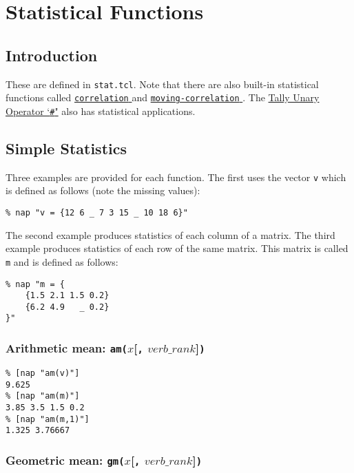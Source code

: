     \section{Statistical Functions}

  \subsection{
    \label{Introduction}Introduction
  }
These are defined in 
  \texttt{stat.tcl}. Note that there are also built-in statistical
  functions called 
  \href{function.html\#Correlation}{ \texttt{correlation} } and 
  \href{function.html\#Correlation}{ \texttt{moving-correlation} }. The 
  \href{op.html\#Tally}{Tally Unary Operator `\texttt{\#}"} also has statistical applications.
  \subsection{
    \label{Simple-Statistics}Simple Statistics
  }

  

Three examples are provided for each function. The first uses the
  vector 
  \texttt{v} which is defined as follows (note the missing
  values):
  \begin{verbatim}
% nap "v = {12 6 _ 7 3 15 _ 10 18 6}"
\end{verbatim}

  

The second example produces statistics of each column of a matrix.
  The third example produces statistics of each row of the same matrix.
  This matrix is called 
  \texttt{m} and is defined as follows:
  \begin{verbatim}
% nap "m = {
    {1.5 2.1 1.5 0.2}
    {6.2 4.9   _ 0.2}
}"
\end{verbatim}

  \subsubsection{
    \label{am}Arithmetic mean: \texttt{am(}$x$[\texttt{,} $verb\_rank$]\texttt{)}
  }

  \begin{verbatim}
% [nap "am(v)"]
9.625
% [nap "am(m)"]
3.85 3.5 1.5 0.2
% [nap "am(m,1)"]
1.325 3.76667
\end{verbatim}

  \subsubsection{
    \label{gm}Geometric mean: \texttt{gm(}$x$[\texttt{,} $verb\_rank$]\texttt{)}
  }

